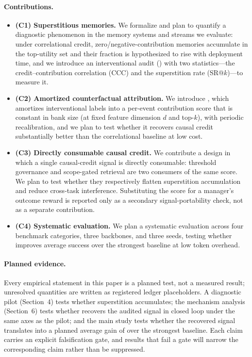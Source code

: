 \paragraph{Contributions.}
\begin{itemize}
  \item \textbf{(C1) Superstitious memories.} We formalize and plan to quantify a
  diagnostic phenomenon in the memory systems and streams we evaluate: under
  correlational credit, zero/negative-contribution
  memories accumulate in the top-utility set and their fraction is hypothesized to
  rise with deployment time, and
  we introduce an interventional audit (\rit{}) with two statistics---the
  credit--contribution correlation (CCC) and the superstition rate (SR@$k$)---to
  measure it.
  \item \textbf{(C2) Amortized counterfactual attribution.} We introduce \aca{},
  which amortizes interventional labels into a per-event contribution
  score that is constant in bank size (at fixed feature dimension $d$ and top-$k$),
  with periodic recalibration, and we plan to test whether it recovers
  causal credit substantially better than the correlational baseline at low cost.
  \item \textbf{(C3) Directly consumable causal credit.} We contribute a design in
  which a single causal-credit signal is directly consumable: threshold governance
  and scope-gated retrieval are two consumers of the same score. We plan to test
  whether they respectively flatten superstition accumulation and reduce
  cross-task interference. Substituting the score for a manager's outcome reward is
  reported only as a secondary signal-portability check, not as a separate
  contribution.
  \item \textbf{(C4) Systematic evaluation.} We plan a systematic evaluation
  across four benchmark categories, three backbones, and three seeds, testing
  whether \method{} improves average success over the strongest baseline at low
  token overhead.
\end{itemize}

\paragraph{Planned evidence.}
Every empirical statement in this paper is a planned test, not a measured result;
unresolved quantities are written as registered ledger placeholders. A diagnostic
pilot (Section~4) tests whether superstition accumulates; the mechanism analysis
(Section~6) tests whether \aca{} recovers the audited signal in closed loop under
the same axes as the pilot; and the main study tests whether the recovered signal
translates into a planned average gain of 
over the strongest baseline. Each claim carries an explicit falsification gate,
and results that fail a gate will narrow the corresponding claim rather than be
suppressed.


